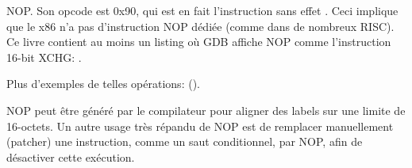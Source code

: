   \item[NOP] \ac{NOP}. Son opcode est 0x90, qui est en fait l'instruction sans effet
  .
  Ceci implique que le x86 n'a pas d'instruction \ac{NOP} dédiée (comme dans de nombreux \ac{RISC}).
  Ce livre contient au moins un listing où GDB affiche NOP comme l'instruction 16-bit XCHG:
  .

  Plus d'exemples de telles opérations:
  ().

  \ac{NOP} peut être généré par le compilateur pour aligner des labels sur une limite
  de 16-octets.
  Un autre usage très répandu de \ac{NOP} est de remplacer manuellement (patcher)
  une instruction, comme un saut conditionnel, par \ac{NOP}, afin de désactiver cette
  exécution.

